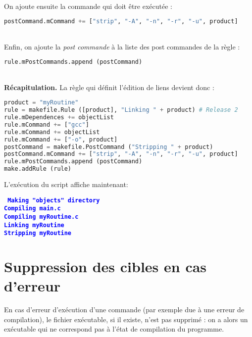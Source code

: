 \documentclass[a4paper,11pt]{extarticle}
\begin{document}
~\\On ajoute ensuite la commande qui doit être exécutée :
\begin{lstlisting}[language=py]
postCommand.mCommand += ["strip", "-A", "-n", "-r", "-u", product]
\end{lstlisting}

~\\Enfin, on ajoute la \emph{post commande} à la liste des post commandes de la règle :
\begin{lstlisting}[language=py]
rule.mPostCommands.append (postCommand)
\end{lstlisting}


~\\{\bf Récapitulation.} La règle qui définit l'édition de liens devient donc :
\begin{lstlisting}[language=py]
product = "myRoutine"
rule = makefile.Rule ([product], "Linking " + product) # Release 2
rule.mDependences += objectList
rule.mCommand += ["gcc"]
rule.mCommand += objectList
rule.mCommand += ["-o", product]
postCommand = makefile.PostCommand ("Stripping " + product)
postCommand.mCommand += ["strip", "-A", "-n", "-r", "-u", product]
rule.mPostCommands.append (postCommand)
make.addRule (rule)
\end{lstlisting}

L'exécution du script affiche maintenant:

\begin{mdframed}[hidealllines=true,backgroundcolor=lightgray!20]
\tt\footnotesize
\textcolor{blue}{\bf Making "objects" directory}\\
\textcolor{blue}{\bf Compiling main.c}\\
\textcolor{blue}{\bf Compiling myRoutine.c}\\
\textcolor{blue}{\bf Linking myRoutine}\\
\textcolor{blue}{\bf Stripping myRoutine}
\end{mdframed}







\section{Suppression des cibles en cas d'erreur}

En cas d'erreur d'exécution d'une commande (par exemple due à une erreur de compilation), le fichier exécutable, si il existe, n'est pas supprimé : on a alors un exécutable qui ne correspond pas à l'état de compilation du programme.
\end{document}
